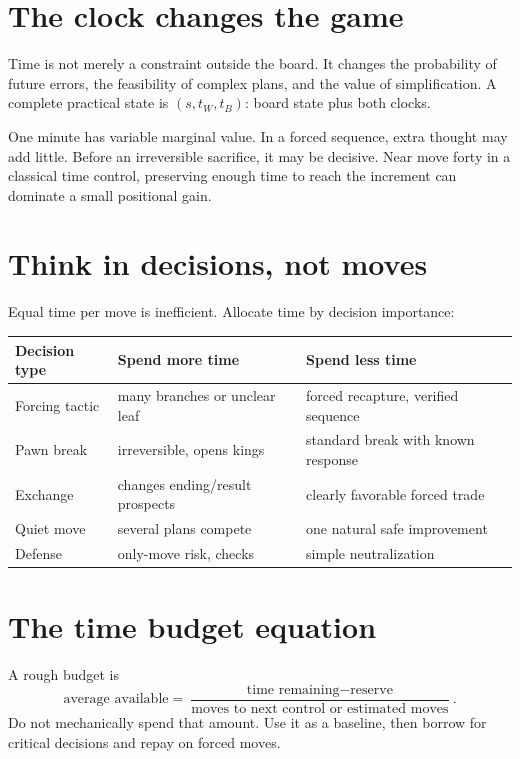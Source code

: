 \section{The clock changes the game}
Time is not merely a constraint outside the board. It changes the probability of future errors, the feasibility of complex plans, and the value of simplification. A complete practical state is $(s,t_W,t_B)$: board state plus both clocks.

One minute has variable marginal value. In a forced sequence, extra thought may add little. Before an irreversible sacrifice, it may be decisive. Near move forty in a classical time control, preserving enough time to reach the increment can dominate a small positional gain.

\section{Think in decisions, not moves}
Equal time per move is inefficient. Allocate time by decision importance:

\begin{center}
\begin{tabularx}{.92\textwidth}{p{}YY}
\toprule
\textbf{Decision type} & \textbf{Spend more time} & \textbf{Spend less time}\\
\midrule
Forcing tactic & many branches or unclear leaf & forced recapture, verified sequence\\
Pawn break & irreversible, opens kings & standard break with known response\\
Exchange & changes ending/result prospects & clearly favorable forced trade\\
Quiet move & several plans compete & one natural safe improvement\\
Defense & only-move risk, checks & simple neutralization\\
\bottomrule
\end{tabularx}
\end{center}

\section{The time budget equation}
A rough budget is
\[
\text{average available} = \frac{\text{time remaining}-\text{reserve}}{\text{moves to next control or estimated moves}}.
\]
Do not mechanically spend that amount. Use it as a baseline, then borrow for critical decisions and repay on forced moves.

